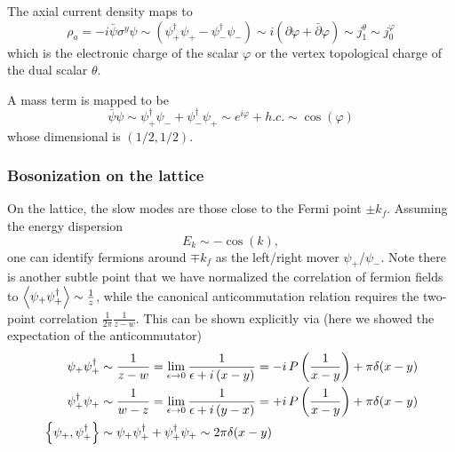 The axial current density maps to 
\begin{equation}
	\rho_a = -i \bar{\psi} \sigma^y \psi \sim \left( \psi^{\dagger}_{+} \psi_{+} - \psi^{\dagger}_{-}\psi_{-} \right) \sim i \left(\partial \varphi + \bar{\partial} \varphi\right) \sim j_1^\theta \sim j_0^\varphi
\end{equation}
which is the electronic charge of the scalar $\varphi$ or the vertex topological charge of the dual scalar $\theta$. 

A mass term is mapped to be 
\begin{equation}
	\bar{\psi} \psi \sim \psi_{+}^\dagger \psi_{-} + \psi_{-}^\dagger \psi_{+} \sim e^{i\varphi} + h.c. \sim \cos\left(\varphi\right)
\end{equation}
whose dimensional is $\left(1/2,1/2\right)$.


\subsubsection{Bosonization on the lattice} 
On the lattice, the slow modes are those close to the Fermi point $\pm k_f$. Assuming the energy dispersion 
\begin{equation}
	E_k \sim -\cos (k),
\end{equation}
one can identify fermions around $\mp k_f$ as the left/right mover $\psi_{+}$/$\psi_{-}$. Note there is another subtle point that we have normalized the correlation of fermion fields to $\expval{\psi_{+}\psi_{+}^\dagger} \sim \frac{1}{z}$, while the canonical anticommutation relation requires the two-point correlation $\frac{1}{2\pi}\frac{1}{z-w}$. This can be shown explicitly via (here we showed the expectation of the anticommutator)
\begin{equation}
	\begin{aligned}
		\psi_{+}\psi_{+}^\dagger & \sim \frac{1}{z-w} = \lim_{\epsilon\rightarrow 0} \frac{1}{\epsilon + i\left(x-y\right)} = -i\,P\left(\frac{1}{x-y}\right) + \pi \delta(x-y)\\
		\psi_{+}^\dagger\psi_{+} & \sim \frac{1}{w-z} = \lim_{\epsilon\rightarrow 0} \frac{1}{\epsilon + i\left(y-x\right)} = +i\,P\left(\frac{1}{x-y}\right) + \pi \delta(x-y)\\
		\anticommutator{\psi_{+}}{\psi_{+}^\dagger} & \sim \psi_{+}\psi_{+}^\dagger + \psi_{+}^\dagger\psi_{+} \sim 2\pi \delta(x-y)
	\end{aligned}
\end{equation}



